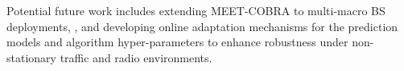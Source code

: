 \documentclass[conference, a4paper]{IEEEtran}
\newcommand{\currentrev}[1]{\textcolor{red}{{}#1}}
\newif\ifshowdeletions
\newcommand{\currentdel}[1]{\ifshowdeletions\textcolor{deletioncolor}{\sout{#1}}\fi}
\theoremstyle{remark}
\begin{document}
Potential future work includes extending MEET-COBRA to multi-macro BS deployments, \currentdel{incorporating more realistic HO latency and signaling overhead}, and developing online adaptation mechanisms for the prediction models and algorithm hyper-parameters to enhance robustness under non-stationary traffic and radio environments.




\end{document}
